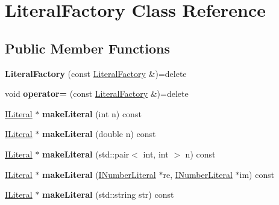 \hypertarget{class_literal_factory}{}\section{Literal\+Factory Class Reference}
\label{class_literal_factory}
\subsection*{Public Member Functions}
\begin{DoxyCompactItemize}
\item 
{\bfseries Literal\+Factory} (const \hyperlink{class_literal_factory}{Literal\+Factory} \&)=delete\hypertarget{class_literal_factory_a5077bb918d1bb4602e187fcdc0233594}{}\label{class_literal_factory_a5077bb918d1bb4602e187fcdc0233594}

\item 
void {\bfseries operator=} (const \hyperlink{class_literal_factory}{Literal\+Factory} \&)=delete\hypertarget{class_literal_factory_a50b8f3d96ec5f50506da79392c57647a}{}\label{class_literal_factory_a50b8f3d96ec5f50506da79392c57647a}

\item 
\hyperlink{class_i_literal}{I\+Literal} $\ast$ {\bfseries make\+Literal} (int n) const \hypertarget{class_literal_factory_a2c247f6ffc8fb323390317eea0ff2f37}{}\label{class_literal_factory_a2c247f6ffc8fb323390317eea0ff2f37}

\item 
\hyperlink{class_i_literal}{I\+Literal} $\ast$ {\bfseries make\+Literal} (double n) const \hypertarget{class_literal_factory_abfeac7e7cee838e62e9f1f3062b46521}{}\label{class_literal_factory_abfeac7e7cee838e62e9f1f3062b46521}

\item 
\hyperlink{class_i_literal}{I\+Literal} $\ast$ {\bfseries make\+Literal} (std\+::pair$<$ int, int $>$ n) const \hypertarget{class_literal_factory_a08c37b9b29232ea4ca50a5e74420ece5}{}\label{class_literal_factory_a08c37b9b29232ea4ca50a5e74420ece5}

\item 
\hyperlink{class_i_literal}{I\+Literal} $\ast$ {\bfseries make\+Literal} (\hyperlink{class_i_number_literal}{I\+Number\+Literal} $\ast$re, \hyperlink{class_i_number_literal}{I\+Number\+Literal} $\ast$im) const \hypertarget{class_literal_factory_a9f4a084c4fbe6b7b39506e3483d953fd}{}\label{class_literal_factory_a9f4a084c4fbe6b7b39506e3483d953fd}

\item 
\hyperlink{class_i_literal}{I\+Literal} $\ast$ {\bfseries make\+Literal} (std\+::string str) const \hypertarget{class_literal_factory_a81d6cea1140f102801eb652a15e9196c}{}\label{class_literal_factory_a81d6cea1140f102801eb652a15e9196c}

\end{DoxyCompactItemize}
